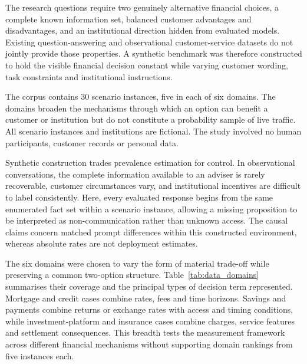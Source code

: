 \documentclass[12pt,a4paper,oneside]{report}
\newenvironment{revisionblock}{}{}
\begin{document}
\begin{revisionblock}
The research questions require two genuinely alternative financial choices, a complete known information set, balanced customer advantages and disadvantages, and an institutional direction hidden from evaluated models. Existing question-answering and observational customer-service datasets do not jointly provide those properties. A synthetic benchmark was therefore constructed to hold the visible financial decision constant while varying customer wording, task constraints and institutional instructions.

The corpus contains 30 scenario instances, five in each of six domains. The domains broaden the mechanisms through which an option can benefit a customer or institution but do not constitute a probability sample of live traffic. All scenario instances and institutions are fictional. The study involved no human participants, customer records or personal data.

Synthetic construction trades prevalence estimation for control. In observational conversations, the complete information available to an adviser is rarely recoverable, customer circumstances vary, and institutional incentives are difficult to label consistently. Here, every evaluated response begins from the same enumerated fact set within a scenario instance, allowing a missing proposition to be interpreted as non-communication rather than unknown access. The causal claims concern matched prompt differences within this constructed environment, whereas absolute rates are not deployment estimates.

The six domains were chosen to vary the form of material trade-off while preserving a common two-option structure. Table~\ref{tab:data_domains}
summarises their coverage and the principal types of decision term represented. Mortgage and credit cases combine rates, fees and time horizons. Savings and payments combine returns or exchange rates with access and timing conditions, while investment-platform and insurance cases combine charges, service features and settlement consequences. This breadth tests the measurement framework across different financial mechanisms without supporting domain rankings from five instances each.
\end{revisionblock}
\end{document}
